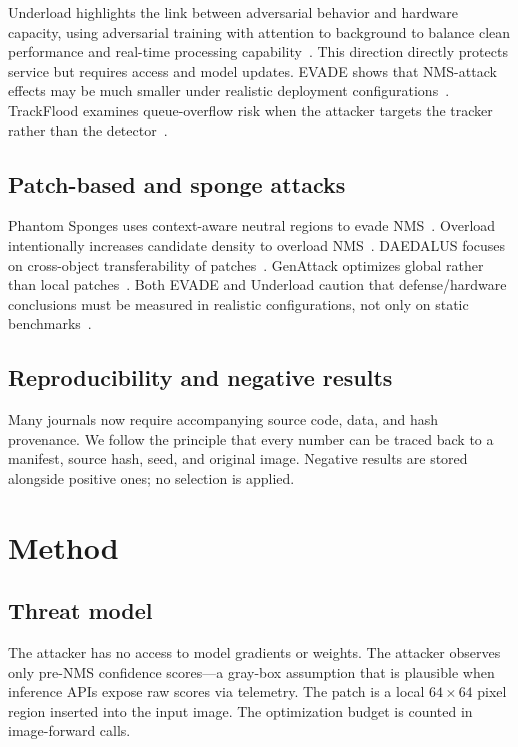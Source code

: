 \documentclass[a4paper,fleqn]{cas-dc}
\begin{document}
Underload highlights the link between adversarial behavior and hardware capacity, using adversarial training with attention to background to balance clean performance and real-time processing capability~\cite{underload2025}. This direction directly protects service but requires access and model updates. EVADE shows that NMS-attack effects may be much smaller under realistic deployment configurations~\cite{evade2025}. TrackFlood examines queue-overflow risk when the attacker targets the tracker rather than the detector~\cite{trackflood2026}.

\subsection{Patch-based and sponge attacks}

Phantom Sponges uses context-aware neutral regions to evade NMS~\cite{phantomsponges2023}. Overload intentionally increases candidate density to overload NMS~\cite{overload2024}. DAEDALUS focuses on cross-object transferability of patches~\cite{daedalus2024}. GenAttack optimizes global rather than local patches~\cite{genattack2019}. Both EVADE and Underload caution that defense/hardware conclusions must be measured in realistic configurations, not only on static benchmarks~\cite{evade2025,underload2025}.

\subsection{Reproducibility and negative results}

Many journals now require accompanying source code, data, and hash provenance. We follow the principle that every number can be traced back to a manifest, source hash, seed, and original image. Negative results are stored alongside positive ones; no selection is applied.

\section{Method}

\subsection{Threat model}

The attacker has no access to model gradients or weights. The attacker observes only pre-NMS confidence scores---a gray-box assumption that is plausible when inference APIs expose raw scores via telemetry. The patch is a local $64 \times 64$ pixel region inserted into the input image. The optimization budget is counted in image-forward calls.
\end{document}
